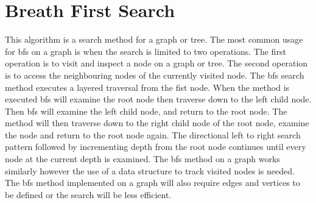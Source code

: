 \section{Breath First Search}
This algorithm is a search method for a graph or tree. 
The most common usage for bfs on a graph is when the search is limited to two operations. 
The first operation is to visit and inspect a node on a graph or tree.
The second operation is to access the neighbouring nodes of the currently visited node.
The bfs search method executes a layered traversal from the fist node.
When the method is executed bfs will examine the root node then traverse down to the left child node.
Then bfs will examine the left child node, and return to the root node.
The method will then traverse down to the right child node of the root node, examine the node and return to the root node again.
The directional left to right search pattern followed by incrementing depth from the root node continues until every node at the current depth is examined.
The bfs method on a graph works similarly however the use of a data structure to track visited nodes is needed.
The bfs method implemented on a graph will also require edges and vertices to be defined or the search will be less efficient. 
